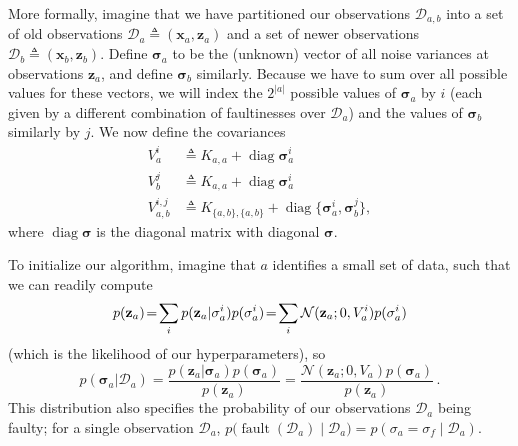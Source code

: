 \documentclass{article}
\newcommand{\deq}{\ensuremath{\triangleq}}
\newcommand{\given}{\ensuremath{\mid}}
\newcommand{\cm}[1]{\ensuremath{\mathcal{#1}}}
\newcommand{\bm}[1]{\ensuremath{\mathbf{#1}}}
\newcommand{\data}{\ensuremath{\cm{D}}}
\newcommand{\vect}[1]{\bm{#1}}
\newcommand{\vz}{\vect{z}}
\newcommand{\vx}{\vect{x}}
\newcommand{\vs}{\vect{\sigma}}
\newcommand{\fPr}{p}
\newcommand{\Prob}[2]{\fPr(#1 \given #2 )}
\newcommand{\ps}[2]{p(#1\vert#2)}
\newcommand{\N}[3]{\cm{N}( #1;#2,#3 )}
\newcommand{\defequal}{\triangleq}
\DeclareMathOperator{\fault}{fault}
\DeclareMathOperator{\diag}{diag}
\begin{document}
More formally, imagine that we have partitioned our observations
$\data_{a,b}$ into a set of old observations
$\data_a\deq(\vx_a,\vz_a)$ and a set of newer observations $\data_b
\deq (\vx_b,\vz_b)$. Define $\vs_{a}$ to be the (unknown) vector of
all noise variances at observations $\vz_{a}$, and define $\vs_{b}$
similarly. Because we have to sum over all possible values for these
vectors, we will index the $2^{\lvert a \rvert}$ possible values of
$\vs_{a}$ by $i$ (each given by a different combination of
faultinesses over $\data_a$) and the values of $\vs_{b}$ similarly by
$j$. We now define the covariances
\begin{align*}
 V_a^i & \defequal K_{a,a} + \diag \vs_{a}^i \\
 V_b^j & \defequal K_{a,a} + \diag \vs_{a}^i \\
 V_{a,b}^{i,j} & \defequal K_{\{a,b\},\{a,b\}} + \diag \{\vs_{a}^i,\vs_{b}^j\},
\end{align*}
where $\diag \vs$ is the diagonal matrix with diagonal $\vs$. 

To initialize our algorithm, imagine that $a$ identifies a small set
of data, such that we can readily compute
\begin{equation}
 \hspace{-0.0cm}p(\vz_a)\!=\!\sum_i  \ps{\vz_a}{\vs^i_a}\fPr(\vs^i_a)
\!=\! \sum_i \N{\vz_a}{0}{V_a^i}\fPr(\vs_a^i) \label{eq:likelihood_a}
\end{equation}
(which is the likelihood of our hyperparameters), so
\begin{equation}
\ps{\vs_a}{\data_{a}} 
= \frac{\ps{\vz_a}{\vs_a}\fPr(\vs_a)}{p(\vz_a)} 
= \frac{\N{\vz_a}{0}{V_a} \fPr(\vs_a)}{p(\vz_a)}\label{eq:psa}\,.
\end{equation}
This distribution also specifies the probability of our observations
$\data_a$ being faulty; for a single observation $\data_a$,
$
p\bigl(\fault(\data_a) \given \data_{a}\bigr) = \Prob{\sigma_a = \sigma_f}{\data_{a}}
$.
\end{document}
